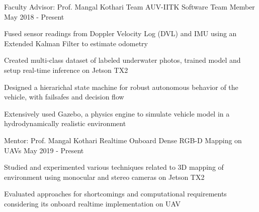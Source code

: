 
\begin{cventries}

 \cventry
    {Faculty Advisor: Prof. Mangal Kothari}
    {Team AUV-IITK}
    {Software Team Member}
    {May 2018 - Present}
    {
      \begin{cvitems}
        \item{Fused sensor readings from Doppler Velocity Log (DVL) and IMU using an Extended Kalman Filter to estimate odometry}
        \item{Created multi-class dataset of labeled underwater photos, trained model and setup real-time inference on Jetson TX2}
        \item{Designed a hierarichal state machine for robust autonomous behavior of the vehicle, with failsafes and decision flow}
        \item{Extensively used Gazebo, a physics engine to simulate vehicle model in a hydrodynamically realistic environment}
      \end{cvitems}
    }
   \cventry
    {Mentor: Prof. Mangal Kothari}
    {Realtime Onboard Dense RGB-D Mapping on UAVs}
    {}
    {May 2019 - Present}
    {
      \begin{cvitems}
        \item {Studied and experimented various techniques related to 3D mapping of environment using monocular and stereo cameras on Jetson TX2}
        \item {Evaluated approaches for shortcomings and computational requirements considering its onboard realtime implementation on UAV}
      \end{cvitems}
    }


\end{cventries}
